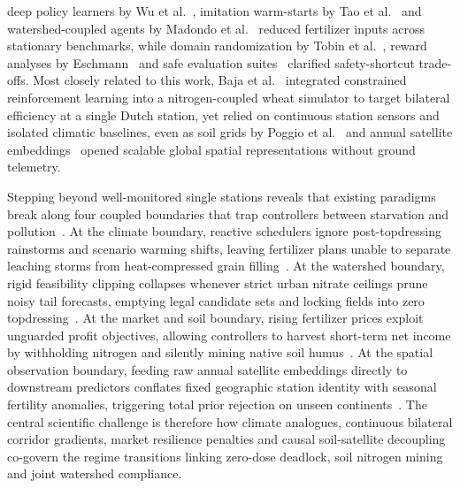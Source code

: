 \documentclass[11pt,a4paper]{article}
\begin{document}
deep policy learners by Wu et al.~\citep{wu2022}, imitation warm-starts by Tao et al.~\citep{tao2022} and watershed-coupled agents by Madondo et al.~\citep{madondo2023} reduced fertilizer inputs across stationary benchmarks, while domain randomization by Tobin et al.~\citep{tobin2017}, reward analyses by Eschmann~\citep{eschmann2021} and safe evaluation suites~\citep{ji2023,sutton2018} clarified safety-shortcut trade-offs. Most closely related to this work, Baja et al.~\citep{baja2025} integrated constrained reinforcement learning into a nitrogen-coupled wheat simulator to target bilateral efficiency at a single Dutch station, yet relied on continuous station sensors and isolated climatic baselines, even as soil grids by Poggio et al.~\citep{poggio2021} and annual satellite embeddings~\citep{brown2025,campsvalls2025} opened scalable global spatial representations without ground telemetry.

Stepping beyond well-monitored single stations reveals that existing paradigms break along four coupled boundaries that trap controllers between starvation and pollution~\citep{baja2025}. At the climate boundary, reactive schedulers ignore post-topdressing rainstorms and scenario warming shifts, leaving fertilizer plans unable to separate leaching storms from heat-compressed grain filling~\citep{asseng2015}. At the watershed boundary, rigid feasibility clipping collapses whenever strict urban nitrate ceilings prune noisy tail forecasts, emptying legal candidate sets and locking fields into zero topdressing~\citep{eu1991,klages2020}. At the market and soil boundary, rising fertilizer prices exploit unguarded profit objectives, allowing controllers to harvest short-term net income by withholding nitrogen and silently mining native soil humus~\citep{eschmann2021,tan2005}. At the spatial observation boundary, feeding raw annual satellite embeddings directly to downstream predictors conflates fixed geographic station identity with seasonal fertility anomalies, triggering total prior rejection on unseen continents~\citep{gaso2023,roberts2017}. The central scientific challenge is therefore how climate analogues, continuous bilateral corridor gradients, market resilience penalties and causal soil-satellite decoupling co-govern the regime transitions linking zero-dose deadlock, soil nitrogen mining and joint watershed compliance.
\end{document}
